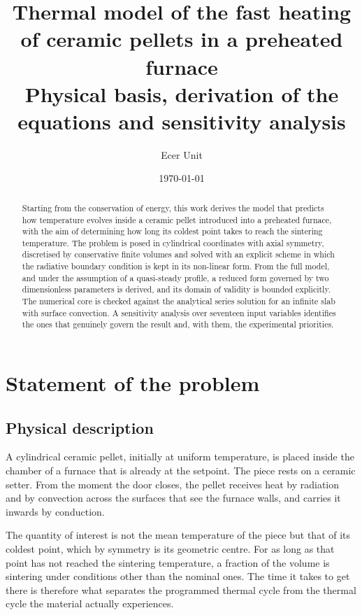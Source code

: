 \documentclass[11pt,a4paper]{article}
\title{\vspace{-1.4cm}\textcolor{uji}{\textbf{Thermal model of the fast
heating of ceramic pellets in a preheated furnace}}\\[0.3em]
\large Physical basis, derivation of the equations and sensitivity analysis}
\author{Ecer Unit}
\date{\today}
\begin{document}
\maketitle
\thispagestyle{fancy}

\begin{abstract}
\noindent
Starting from the conservation of energy, this work derives the model that
predicts how temperature evolves inside a ceramic pellet introduced into a
preheated furnace, with the aim of determining how long its coldest point
takes to reach the sintering temperature. The problem is posed in
cylindrical coordinates with axial symmetry, discretised by conservative
finite volumes and solved with an explicit scheme in which the radiative
boundary condition is kept in its non-linear form. From the full model, and
under the assumption of a quasi-steady profile, a reduced form governed by
two dimensionless parameters is derived, and its domain of validity is
bounded explicitly. The numerical core is checked against the analytical
series solution for an infinite slab with surface convection. A sensitivity
analysis over seventeen input variables identifies the ones that genuinely
govern the result and, with them, the experimental priorities.
\end{abstract}

\tableofcontents
\vspace{0.6em}

\section{Statement of the problem}

\subsection{Physical description}

A cylindrical ceramic pellet, initially at uniform temperature, is placed
inside the chamber of a furnace that is already at the setpoint. The piece
rests on a ceramic setter. From the moment the door closes, the pellet
receives heat by radiation and by convection across the surfaces that see
the furnace walls, and carries it inwards by conduction.

The quantity of interest is not the mean temperature of the piece but that
of its coldest point, which by symmetry is its geometric centre. For as long
as that point has not reached the sintering temperature, a fraction of the
volume is sintering under conditions other than the nominal ones. The time
it takes to get there is therefore what separates the programmed thermal
cycle from the thermal cycle the material actually experiences.
\end{document}
